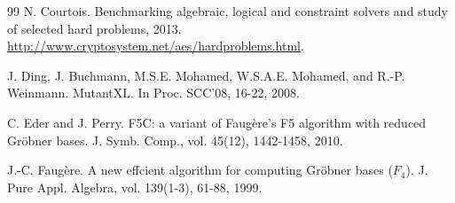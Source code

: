 \documentclass[final, number, 3p,12pt]{elsarticle}
\begin{document}
\begin{thebibliography}{99}
N. Courtois. Benchmarking algebraic, logical and constraint solvers and study of selected hard problems, 2013. {\url{http://www.cryptosystem.net/aes/hardproblems.html}}.




J. Ding, J. Buchmann, M.S.E. Mohamed, W.S.A.E. Mohamed, and R.-P. Weinmann. MutantXL. In Proc. SCC'08, 16-22, 2008.


C. Eder and J. Perry. F5C: a variant of Faug\`ere's F5 algorithm with reduced Gr\"obner bases. J. Symb. Comp., vol. 45(12), 1442-1458, 2010.



%



J.-C. Faug\`ere. A new effcient algorithm for computing Gr\"obner bases ($F_4$). J. Pure Appl. Algebra, vol. 139(1-3), 61-88, 1999.




\end{thebibliography}
\end{document}
